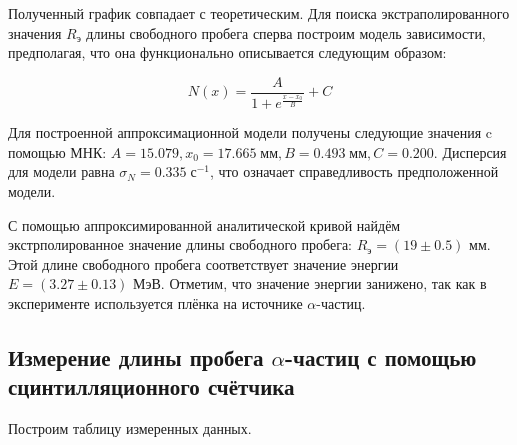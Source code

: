     Полученный график совпадает с теоретическим. Для поиска экстраполированного значения $R_{\text{э}}$ длины свободного пробега сперва построим модель зависимости, предполагая, что она функционально описывается следующим образом:

    \begin{equation}
        N(x) = \frac{A}{1 + e^{\frac{x - x_0}{B}}} + C
    \end{equation}

    Для построенной аппроксимационной модели получены следующие значения c помощью МНК: $A = 15.079, x_0 = 17.665 \; \text{мм}, B = 0.493 \; \text{мм}, C = 0.200$. Дисперсия для модели равна $\sigma_N = 0.335 \; \text{с}^{-1}$, что означает справедливость предположенной модели.
    
    С помощью аппроксимированной аналитической кривой найдём экстрполированное значение длины свободного пробега: $R_{\text{э}} = (19 \pm 0.5)$ мм. Этой длине свободного пробега соответствует значение энергии $E = (3.27 \pm 0.13)$ МэВ. Отметим, что значение энергии занижено, так как в эксперименте используется плёнка на источнике $\alpha$-частиц.

\subsection{Измерение длины пробега $\alpha$-частиц с помощью сцинтилляционного счётчика}

    Построим таблицу измеренных данных.

